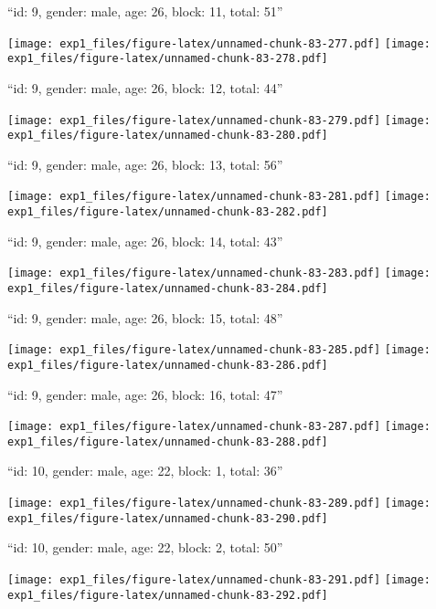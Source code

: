 \documentclass[11pt,,]{article}
\begin{document}
\newpage
[1] 

``id: 9, gender: male, age: 26, block: 11, total: 51''

\texttt{[image: exp1\_files/figure-latex/unnamed-chunk-83-277.pdf]}
\texttt{[image: exp1\_files/figure-latex/unnamed-chunk-83-278.pdf]}

\newpage
[1] 

``id: 9, gender: male, age: 26, block: 12, total: 44''

\texttt{[image: exp1\_files/figure-latex/unnamed-chunk-83-279.pdf]}
\texttt{[image: exp1\_files/figure-latex/unnamed-chunk-83-280.pdf]}

\newpage
[1] 

``id: 9, gender: male, age: 26, block: 13, total: 56''

\texttt{[image: exp1\_files/figure-latex/unnamed-chunk-83-281.pdf]}
\texttt{[image: exp1\_files/figure-latex/unnamed-chunk-83-282.pdf]}

\newpage
[1] 

``id: 9, gender: male, age: 26, block: 14, total: 43''

\texttt{[image: exp1\_files/figure-latex/unnamed-chunk-83-283.pdf]}
\texttt{[image: exp1\_files/figure-latex/unnamed-chunk-83-284.pdf]}

\newpage
[1] 

``id: 9, gender: male, age: 26, block: 15, total: 48''

\texttt{[image: exp1\_files/figure-latex/unnamed-chunk-83-285.pdf]}
\texttt{[image: exp1\_files/figure-latex/unnamed-chunk-83-286.pdf]}

\newpage
[1] 

``id: 9, gender: male, age: 26, block: 16, total: 47''

\texttt{[image: exp1\_files/figure-latex/unnamed-chunk-83-287.pdf]}
\texttt{[image: exp1\_files/figure-latex/unnamed-chunk-83-288.pdf]}

\newpage
[1] 

``id: 10, gender: male, age: 22, block: 1, total: 36''

\texttt{[image: exp1\_files/figure-latex/unnamed-chunk-83-289.pdf]}
\texttt{[image: exp1\_files/figure-latex/unnamed-chunk-83-290.pdf]}

\newpage
[1] 

``id: 10, gender: male, age: 22, block: 2, total: 50''

\texttt{[image: exp1\_files/figure-latex/unnamed-chunk-83-291.pdf]}
\texttt{[image: exp1\_files/figure-latex/unnamed-chunk-83-292.pdf]}
\end{document}
